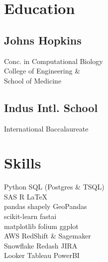 \documentclass[a4paper]{deedy-resume-openfont} %
\begin{document}
\begin{minipage}[t]{0.33\textwidth} %


\section{Education} 
\subsection{Johns Hopkins}
Conc. in Computational Biology \\
College of Engineering \&\\ School of Medicine \\
\sectionsep %


\subsection{Indus Intl. School}

International Baccalaureate
\sectionsep
%


\section{Skills}

\textbullet{} Python  \textbullet{} SQL (Postgres \& TSQL) \\ 
\textbullet{} SAS \textbullet{} R \textbullet{} \LaTeX\ \\ 
\sectionsep %
\textbullet{} pandas \textbullet{} shapely \textbullet{} GeoPandas\\
\textbullet{} scikit-learn \textbullet{} fastai\\
\textbullet{} matplotlib \textbullet{} folium \textbullet{} ggplot\\
\sectionsep %
\textbullet{} AWS RedShift \& Sagemaker\\
\textbullet{} Snowflake \textbullet{} Redash \textbullet{} JIRA\\
\textbullet{} Looker \textbullet{} Tableau \textbullet{} PowerBI \\
\sectionsep %


\end{minipage}
\end{document}
